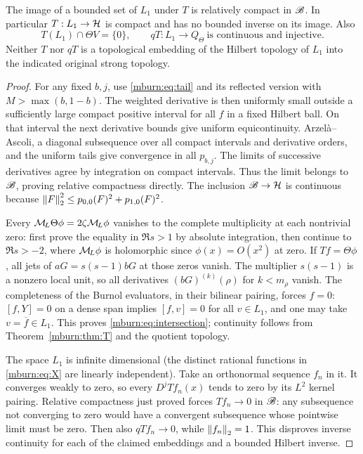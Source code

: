 \begin{mburnproposition}
\label{mburn:prop:quotient}
The image of a bounded set of $L_1$ under $T$ is relatively
compact in $\mathscr B$. In particular $T:L_1\to\mathcal H$ is compact and
has no bounded inverse on its image. Also
\begin{equation}\label{mburn:eq:intersection}
 T(L_1)\cap\Theta V=\{0\},\qquad
 qT:L_1\longrightarrow Q_\Theta\ \text{is continuous and injective}.
\end{equation}
Neither $T$ nor $qT$ is a topological embedding of the Hilbert
topology of $L_1$ into the indicated original strong topology.
\end{mburnproposition}
\begin{proof}
For any fixed $b,j$, use \eqref{mburn:eq:tail} and its reflected version
with $M>\max(b,1-b)$. The weighted derivative is then uniformly
small outside a sufficiently large compact positive interval for
all $f$ in a fixed Hilbert ball. On that interval the next
derivative bounds give uniform equicontinuity. Arzel\`a--Ascoli,
a diagonal subsequence over all compact intervals and derivative
orders, and the uniform tails give convergence in all $p_{b,j}$.
The limits of successive derivatives agree by integration on
compact intervals. Thus the limit belongs to $\mathscr B$, proving
relative compactness directly. The inclusion $\mathscr B\to\mathcal H$ is
continuous because
$\left\lVert F\right\rVert_2^2\leq p_{0,0}(F)^2+p_{1,0}(F)^2$.

Every $\mathcal M_{\!L}\Theta\phi=2\zeta\mathcal M_{\!L}\phi$ vanishes to the complete
multiplicity at each nontrivial zero: first prove the equality in
$\Re s>1$ by absolute integration, then continue to $\Re s>-2$,
where $\mathcal M_{\!L}\phi$ is holomorphic since $\phi(x)=O(x^2)$ at zero.
If $Tf=\Theta\phi$, all jets of $aG=s(s-1)bG$ at those zeros
vanish. The multiplier $s(s-1)$ is a nonzero local unit, so all
derivatives $(bG)^{(k)}(\rho)$ for $k<m_\rho$ vanish. The
completeness of the Burnol evaluators, in their bilinear pairing,
forces $f=0$: $[f,Y]=0$ on a dense span implies $[f,v]=0$ for
all $v\in L_1$, and one may take $v=\overline f\in L_1$.
This proves \eqref{mburn:eq:intersection}; continuity follows from
Theorem~\ref{mburn:thm:T} and the quotient topology.

The space $L_1$ is infinite dimensional (the distinct rational
functions in \eqref{mburn:eq:X} are linearly independent). Take an
orthonormal sequence $f_n$ in it. It converges weakly to zero, so
every $D^jTf_n(x)$ tends to zero by its $L^2$ kernel pairing.
Relative compactness just proved forces $Tf_n\to0$ in $\mathscr B$:
any subsequence not converging to zero would have a convergent
subsequence whose pointwise limit must be zero. Then also
$qTf_n\to0$, while $\left\lVert f_n\right\rVert_2=1$. This disproves inverse
continuity for each of the claimed embeddings and a bounded
Hilbert inverse.
\end{proof}

